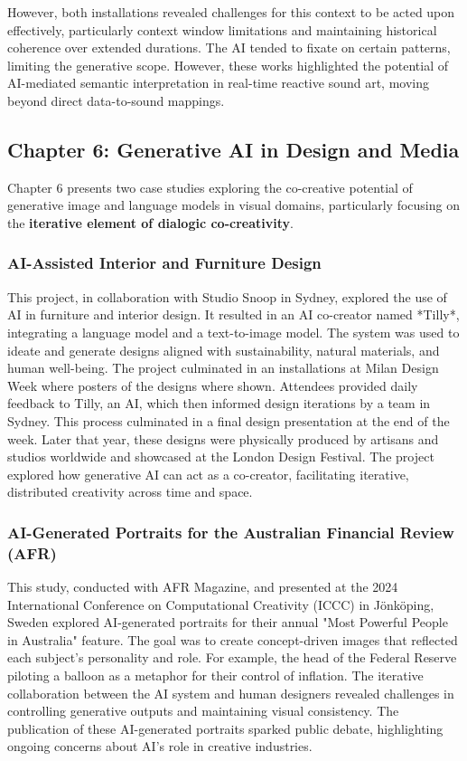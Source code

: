 However, both installations revealed challenges for this context to be acted upon effectively, particularly context window limitations and maintaining historical coherence over extended durations. The AI tended to fixate on certain patterns, limiting the generative scope. However, these works highlighted the potential of AI-mediated semantic interpretation in real-time reactive sound art, moving beyond direct data-to-sound mappings.

\subsection*{Chapter 6: Generative AI in Design and Media}

Chapter 6 presents two case studies exploring the co-creative potential of generative image and language models in visual domains, particularly focusing on the \textbf{iterative element of dialogic co-creativity}. 

\subsubsection*{AI-Assisted Interior and Furniture Design}

This project, in collaboration with Studio Snoop in Sydney, explored the use of AI in furniture and interior design. It resulted in an AI co-creator named *Tilly*, integrating a language model and a text-to-image model. The system was used to ideate and generate designs aligned with sustainability, natural materials, and human well-being. The project culminated in an installations at Milan Design Week where posters of the designs where shown. Attendees provided daily feedback to Tilly, an AI, which then informed design iterations by a team in Sydney.  This process culminated in a final design presentation at the end of the week.  Later that year, these designs were physically produced by artisans and studios worldwide and showcased at the London Design Festival. The project explored how generative AI can act as a co-creator, facilitating iterative, distributed creativity across time and space.

\subsubsection*{AI-Generated Portraits for the Australian Financial Review (AFR)}

This study, conducted with AFR Magazine, and presented at the 2024 International Conference on Computational Creativity (ICCC) in Jönköping, Sweden explored AI-generated portraits for their annual "Most Powerful People in Australia" feature. The goal was to create concept-driven images that reflected each subject’s personality and role. For example, the head of the Federal Reserve piloting a balloon as a metaphor for their control of inflation. The iterative collaboration between the AI system and human designers revealed challenges in controlling generative outputs and maintaining visual consistency. The publication of these AI-generated portraits sparked public debate, highlighting ongoing concerns about AI's role in creative industries.

